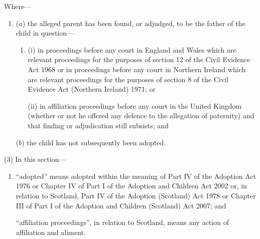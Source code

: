 \documentclass[a4paper]{article}
\begin{document}
Where---
\begin{enumerate}\item[]
($a$) the alleged parent has been found, or adjudged, to be the father of the child in question---
\begin{enumerate}\item[]
(i)
in proceedings before any court in England and Wales which are relevant proceedings for the purposes of section 12 of the Civil Evidence Act 1968 or in proceedings before any court in Northern Ireland which are relevant proceedings for the purposes of section 8 of the Civil Evidence Act (Northern Ireland) 1971; or

(ii)
in affiliation proceedings before any court in the United Kingdom (whether or not he offered any defence to the allegation of paternity) and that finding or adjudication still subsists; and
\end{enumerate}

($b$) the child has not subsequently been adopted.
\end{enumerate}

(3) In this section---
\begin{enumerate}\item[]
 “adopted” means adopted within the meaning of Part IV of the Adoption Act 1976 or Chapter IV of Part I of the Adoption and Children Act 2002 or, in relation to Scotland, Part IV of the Adoption (Scotland) Act 1978 or Chapter III of Part I of the Adoption and Children (Scotland) Act 2007; and 

“affiliation proceedings”, in relation to Scotland, means any action of affiliation and aliment.
\end{enumerate}
\end{document}
